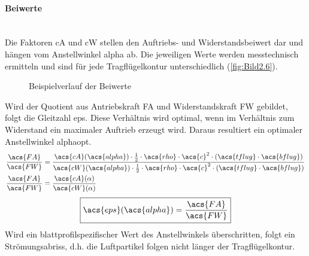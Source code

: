 \paragraph{Beiwerte}\mbox{}\smallskip\\
Die Faktoren \acs{cA} und \acs{cW} stellen den Auftriebs- und Widerstandsbeiwert dar und hängen vom Anstellwinkel \acs{alpha} ab. Die jeweiligen Werte werden messtechnisch ermitteln und sind für jede Tragflügelkontur unterschiedlich (\autoref{fig:Bild2.6}).
\begin{figure}[H]
   \centering
   \caption[Beispielverlauf der Beiwerte]{Beispielverlauf der Beiwerte}
   \label{fig:Bild2.6}
\end{figure}
\newpage
Wird der Quotient aus Antriebskraft \acs{FA} und Widerstandskraft \acs{FW} gebildet, folgt die Gleitzahl \acs{eps}. Diese Verhältnis wird optimal, wenn im Verhältnis zum Widerstand ein maximaler Auftrieb erzeugt wird. Daraus resultiert ein optimaler Anstellwinkel \acs{alphaopt}.
\begin{align}
    \frac{\acs{FA}}{\acs{FW}} &= \frac{\acs{cA}(\acs{alpha}) \cdot \frac{1}{2} \cdot \acs{rho} \cdot \acs{c}^2 \cdot (\acs{tflug} \cdot \acs{bflug})}{\acs{cW}(\acs{alpha}) \cdot \frac{1}{2} \cdot \acs{rho} \cdot \acs{c}^2 \cdot (\acs{tflug} \cdot \acs{bflug})} \nonumber \\
    \frac{\acs{FA}}{\acs{FW}} &= \frac{\acs{cA}(\alpha)}{\acs{cW}(\alpha)} \label{eq:Gleichung2.17}
\end{align}
\begin{equation} \label{eq:Gleichung2.18}
    \boxed{\acs{eps}(\acs{alpha}) = \frac{\acs{FA}}{\acs{FW}}}
\end{equation}
\newline
Wird ein blattprofilspezifischer Wert des Anstellwinkels überschritten, folgt ein Strömungsabriss, d.h. die Luftpartikel folgen nicht länger der Tragflügelkontur.


